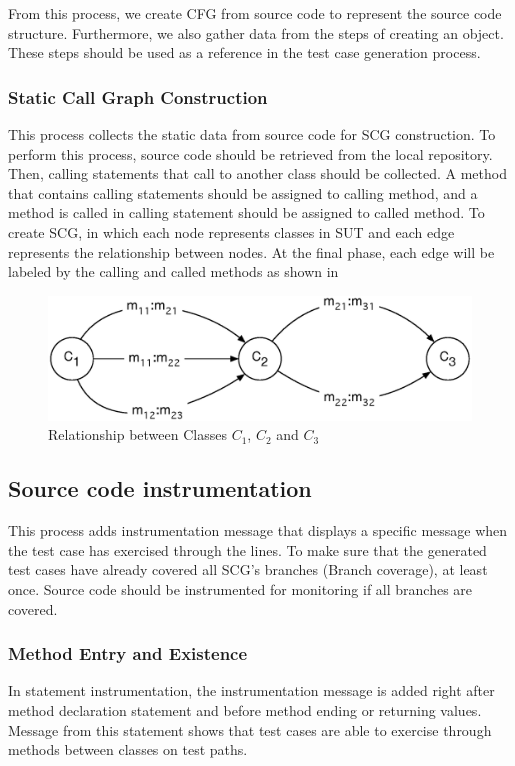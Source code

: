 From this process, we create CFG from source code to represent 
the source code structure. Furthermore, we also gather data 
from the steps of creating an object. These steps should be used 
as a reference in the test case generation process.

\subsubsection{Static Call Graph Construction}

This process collects the static data from source code 
for SCG construction. To perform this process, source code 
should be retrieved from the local repository. Then, calling statements 
that call to another class should be collected. A method that 
contains calling statements should be assigned to calling method, 
and a method is called in calling statement should be assigned 
to called method. To create SCG, in which each node represents classes 
in SUT and each edge represents the relationship between nodes. 
At the final phase, each edge will be labeled by the calling and 
called methods as shown in 

\begin{figure}[bh!]
\centering
\includegraphics[width=\linewidth]{figures/Relationship-between-Classes}
\caption{Relationship between Classes $C_1$, $C_2$ and $C_3$}
\label{fig:relationship}
\end{figure}

\subsection{Source code instrumentation}

This process adds instrumentation message that displays 
a specific message when the test case has exercised through 
the lines. To make sure that the generated test cases have 
already covered all SCG’s branches (Branch coverage), at least once. 
Source code should be instrumented for monitoring if all branches 
are covered.

\subsubsection{Method Entry and Existence}
In statement instrumentation, the instrumentation message is 
added right after method declaration statement and before method 
ending or returning values. Message from this statement shows 
that test cases are able to exercise through methods 
between classes on test paths.

